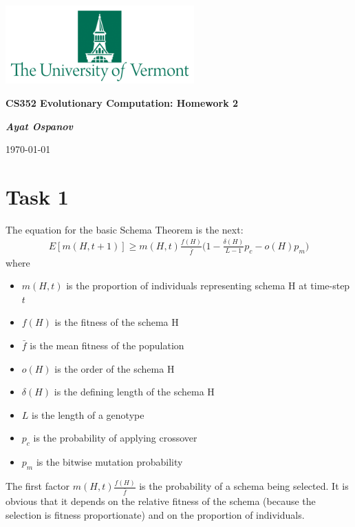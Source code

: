 \documentclass[12pt, a4paper]{article}
\begin{document}
    \begin{center}
        \includegraphics[height=3cm]{UVM}

        {\large\textbf{
            CS352 Evolutionary Computation: Homework 2
        }}

        \vspace{0.3cm}

        \textit{\textbf{Ayat Ospanov}}

        \today
    \end{center}

    \tableofcontents

    \section{Task 1}
        The equation for the basic Schema Theorem is the next:
        \begin{align*}
            E[m(H, t+1)] \geq m(H, t) \frac{f(H)}{\bar{f}} \Big(1 - \frac{\delta(H)}{L - 1}p_c - o(H) p_m\Big)
        \end{align*}
        where
        \begin{itemize}
            \item $m(H, t)$ is the proportion of individuals representing schema H at time-step $t$
            \item $f(H)$ is the fitness of the schema H
            \item $\bar{f}$ is the mean fitness of the population
            \item $o(H)$ is the order of the schema H
            \item $\delta(H)$ is the defining length of the schema H
            \item $L$ is the length of a genotype
            \item $p_c$ is the probability of applying crossover
            \item $p_m$ is the bitwise mutation probability
        \end{itemize}

        The first factor $m(H, t) \frac{f(H)}{\bar{f}}$ is the probability of a
        schema being selected. It is obvious that it depends on the relative fitness
        of the schema (because the selection is fitness proportionate) and on the
        proportion of individuals.
\end{document}
